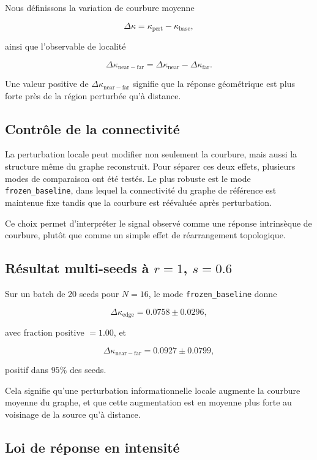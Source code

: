 \documentclass[11pt]{article}
\begin{document}
Nous définissons la variation de courbure moyenne

\[
\Delta \kappa = \kappa_{\mathrm{pert}}-\kappa_{\mathrm{base}},
\]

ainsi que l'observable de localité

\[
\Delta \kappa_{\mathrm{near-far}}
=
\Delta \kappa_{\mathrm{near}}
-
\Delta \kappa_{\mathrm{far}}.
\]

Une valeur positive de $\Delta \kappa_{\mathrm{near-far}}$ signifie que la réponse géométrique est plus forte près de la région perturbée qu'à distance.

\subsection{Contrôle de la connectivité}

La perturbation locale peut modifier non seulement la courbure, mais aussi la structure même du graphe reconstruit. Pour séparer ces deux effets, plusieurs modes de comparaison ont été testés. Le plus robuste est le mode \texttt{frozen\_baseline}, dans lequel la connectivité du graphe de référence est maintenue fixe tandis que la courbure est réévaluée après perturbation.

Ce choix permet d'interpréter le signal observé comme une réponse intrinsèque de courbure, plutôt que comme un simple effet de réarrangement topologique.

\subsection{Résultat multi-seeds à $r=1$, $s=0.6$}

Sur un batch de 20 seeds pour $N=16$, le mode \texttt{frozen\_baseline} donne

\[
\Delta \kappa_{\mathrm{edge}} = 0.0758 \pm 0.0296,
\]

avec fraction positive $=1.00$, et

\[
\Delta \kappa_{\mathrm{near-far}} = 0.0927 \pm 0.0799,
\]

positif dans $95\%$ des seeds.

Cela signifie qu'une perturbation informationnelle locale augmente la courbure moyenne du graphe, et que cette augmentation est en moyenne plus forte au voisinage de la source qu'à distance.

\subsection{Loi de réponse en intensité}
\end{document}
